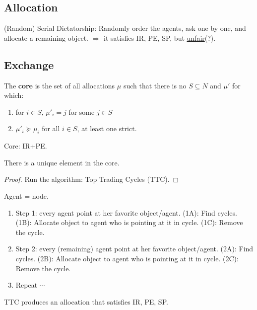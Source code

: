 \documentclass[11pt]{elegantbook}
\begin{document}
\subsection{Allocation}
(Random) Serial Dictatorship: Randomly order the agents, ask one by one, and allocate a remaining object. $\Rightarrow$ it satisfies IR, PE, SP, but \underline{unfair}(?).

\subsection{Exchange}
\begin{definition}[Core]
    \normalfont
    The \textbf{core} is the set of all allocations $\mu$ such that there is no $S\subseteq N$ and $\mu'$ for which:
    \begin{enumerate}[$\circ$]
        \item for $i\in S$, $\mu'_i=j$ for some $j\in S$
        \item $\mu'_i\succeq \mu_i$ for all $i\in S$, at least one strict.
    \end{enumerate}
    Core: IR+PE.
\end{definition}
\begin{theorem}
    There is a unique element in the core.
\end{theorem}
\begin{proof}
    Run the algorithm: Top Trading Cycles (TTC).
\end{proof}
\begin{definition}
    \normalfont
    Agent = node.
    \begin{enumerate}
        \item Step 1: every agent point at her favorite object/agent.
        \subitem (1A): Find cycles.
        \subitem (1B): Allocate object to agent who is pointing at it in cycle.
        \subitem (1C): Remove the cycle.
        \item Step 2: every (remaining) agent point at her favorite object/agent.
        \subitem (2A): Find cycles.
        \subitem (2B): Allocate object to agent who is pointing at it in cycle.
        \subitem (2C): Remove the cycle.
        \item Repeat $\cdots$
    \end{enumerate}
\end{definition}
\begin{proposition}
    TTC produces an allocation that satisfies IR, PE, SP.
\end{proposition}
\end{document}

